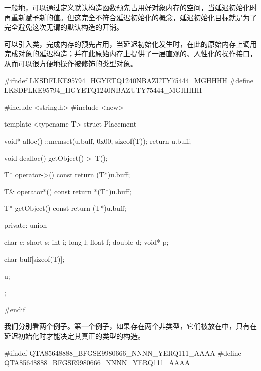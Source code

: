 \begin{content}
\begin{enum}
\end{enum}

一般地，可以通过定义默认构造函数预先占用好对象内存的空间，当延迟初始化时再重新赋予新的值。但这完全不符合延迟初始化的概念，延迟初始化目标就是为了完全避免这次无谓的默认构造的开销。

可以引入类，完成内存的预先占用，当延迟初始化发生时，在此的原始内存上调用完成对象的延迟构造；并在此原始内存上提供了一层直观的、人性化的操作接口，从而可以很方便地操作被修饰的类型对象。

\begin{leftbar}
\begin{c++}[caption={base/Placement.h}]
#ifndef LKSDFLKE95794_HGYETQ1240NBAZUTY75444_MGHHHH
#define LKSDFLKE95794_HGYETQ1240NBAZUTY75444_MGHHHH

#include <string.h>
#include <new>

template <typename T>
struct Placement
{
    void* alloc()
    {
        ::memset(u.buff, 0x00, sizeof(T));
        return u.buff;
    }

    void dealloc()
    {
        getObject()->~T();
    }    

    T* operator->() const
    {
        return (T*)u.buff;
    }

    T& operator*() const
    {
        return *(T*)u.buff;
    }

    T* getObject() const
    {
        return (T*)u.buff;
    }

private:
    union
    {
        char   c;
        short  s;
        int    i;
        long   l;
        float  f;
        double d;
        void*  p;

        char buff[sizeof(T)];
    }u;
};

#endif
\end{c++}
\end{leftbar}

我们分别看两个例子。第一个例子，如果存在两个非类型，它们被放在中，只有在延迟初始化时才能决定其真正的类型的构造。

\begin{leftbar}
\begin{c++}[caption={money/AccountFactory.h}]
#ifndef QTA85648888_BFGSE9980666_NNNN_YERQ111_AAAA
#define QTA85648888_BFGSE9980666_NNNN_YERQ111_AAAA


\end{c++}
\end{leftbar}
\end{content}
